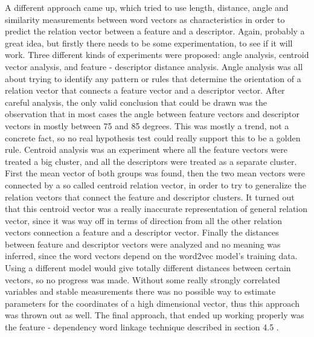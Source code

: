 \documentclass{sig-alternate}
\begin{document}
A different approach came up, which tried to use length, distance, angle and similarity measurements between word vectors as characteristics in order to predict the relation vector between a feature and a descriptor. Again, probably a great idea, but firstly there needs to be some experimentation, to see if it will work. Three different kinds of experiments were proposed: angle analysis, centroid vector analysis, and feature - descriptor distance analysis. Angle analysis was all about trying to identify any pattern or rules that determine the orientation of a relation vector that connects a feature vector and a descriptor vector. After careful analysis, the only valid conclusion that could be drawn was the observation that in most cases the angle between feature vectors and descriptor vectors in mostly between 75 and 85 degrees. This was mostly a trend, not a concrete fact, so no real hypothesis test could really support this to be a golden rule. Centroid analysis was an experiment where all the feature vectors were treated a big cluster, and all the descriptors were treated as a separate cluster. First the mean vector of both groups was found, then the two mean vectors were connected by a so called centroid relation vector, in order to try to generalize the relation vectors that connect the feature and descriptor clusters. It turned out that this centroid vector was a really inaccurate representation of general relation vector, since it was way off in terms of direction from all the other relation vectors connection a feature and a descriptor vector. Finally the distances between feature and descriptor vectors were analyzed and no meaning was inferred, since the word vectors depend on the word2vec model’s training data. Using a different model would give totally different distances between certain vectors, so no progress was made. Without some really strongly correlated variables and stable measurements there was no possible way to estimate parameters for the coordinates of a high dimensional vector, thus this approach was thrown out as well. The final approach, that ended up working properly was the feature - dependency word linkage technique described in section 4.5 .
\end{document}
